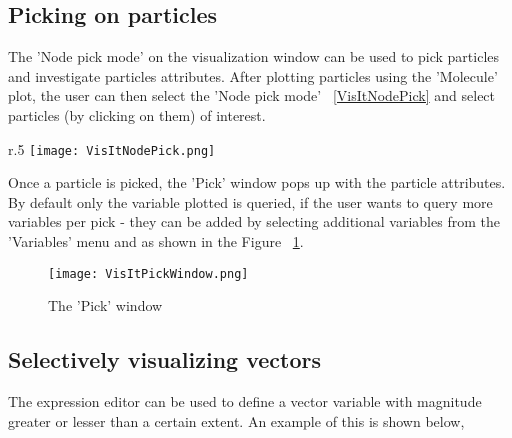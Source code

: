 \subsection{Picking on particles}

The 'Node pick mode' on the visualization window can be used to pick
particles and investigate particles attributes. After plotting
particles using the 'Molecule' plot, the user can then select the
'Node pick mode' ~\ref{VisItNodePick} and select particles (by
clicking on them) of interest.

 \begin{wrapfigure}{r}{.5\textwidth}
   \center
   \texttt{[image: VisItNodePick.png]}
   \caption{The 'Node pick mode' on the visualization window}
   \label{VisItNodePick}
 \end{wrapfigure}

Once a particle is picked, the 'Pick' window pops up with the particle
attributes. By default only the variable plotted is queried, if the
user wants to query more variables per pick - they can be added by
selecting additional variables from the 'Variables' menu and as shown
in the Figure ~\ref{VisItPickWindow}.



\begin{figure}[h]
  \centering
  \texttt{[image: VisItPickWindow.png]}
  \caption{The 'Pick' window}
  \label{VisItPickWindow}
\end{figure}

\subsection{Selectively visualizing vectors}
The expression editor can be used to define a vector variable with magnitude greater or lesser than a certain extent. An example of this is shown below,

